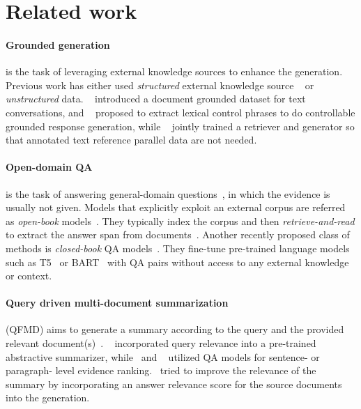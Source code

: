 \documentclass[11pt]{article}
\begin{document}
\section{Related work}
\vspace{-5pt}
\paragraph{Grounded generation} is the task of leveraging external knowledge sources to enhance the generation. Previous work has either used \textit{structured} external knowledge source ~\cite{liu2018knowledge,young2018augmenting,su2020multi} or \textit{unstructured} data. ~\citet{zhou2018dataset} introduced a document grounded dataset for text conversations, and ~\citet{wu2021controllable} proposed to extract lexical control phrases to do controllable grounded response generation, while ~\citet{zhang2021joint} jointly trained a retriever and generator so that annotated text reference parallel data are not needed. 

\vspace{-5pt}
\paragraph{Open-domain QA} is the task of answering general-domain questions~\cite{chen2017reading}, in which the evidence is usually not given. Models that explicitly exploit an external corpus are referred as \textit{open-book} models~\cite{roberts2020much}. They typically index the corpus and then \textit{retrieve-and-read} to extract the answer span from documents~\cite{chen2017reading, lee2019latent, izacard2021leveraging,NEURIPS2020_6b493230}. Another recently proposed class of methods is \textit{closed-book} QA models~\cite{ye2020studying,roberts2020much}. They fine-tune pre-trained language models such as T5~\cite{raffel2020exploring} or BART~\cite{lewis2020bart} with QA pairs without access to any external knowledge or context.

\vspace{-5pt}
\paragraph{Query driven multi-document summarization} (QFMD) aims to generate a summary according to the query and the provided relevant document(s)~\cite{tombros1998advantages}. ~\citet{baumel2018query} incorporated query relevance into a pre-trained abstractive summarizer, while~\citet{xu2020coarse} and ~\citet{su2020caire} utilized QA models for sentence- or paragraph- level evidence ranking.~\citet{su-etal-2021-improve} tried to improve the relevance of the summary by incorporating an answer relevance score for the source documents into the generation. 
\end{document}
